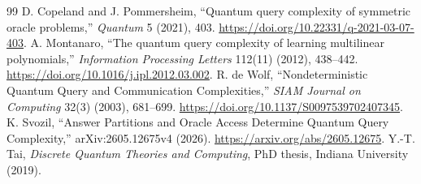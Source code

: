 \documentclass[11pt]{article}
\begin{document}
\begin{thebibliography}{99}
 D. Copeland and J. Pommersheim, ``Quantum query complexity of symmetric oracle problems,'' \emph{Quantum} 5 (2021), 403. \url{https://doi.org/10.22331/q-2021-03-07-403}.
 A. Montanaro, ``The quantum query complexity of learning multilinear polynomials,'' \emph{Information Processing Letters} 112(11) (2012), 438--442. \url{https://doi.org/10.1016/j.ipl.2012.03.002}.
 R. de Wolf, ``Nondeterministic Quantum Query and Communication Complexities,'' \emph{SIAM Journal on Computing} 32(3) (2003), 681--699. \url{https://doi.org/10.1137/S0097539702407345}.
 K. Svozil, ``Answer Partitions and Oracle Access Determine Quantum Query Complexity,'' arXiv:2605.12675v4 (2026). \url{https://arxiv.org/abs/2605.12675}.
 Y.-T. Tai, \emph{Discrete Quantum Theories and Computing}, PhD thesis, Indiana University (2019).
\end{thebibliography}
\end{document}
